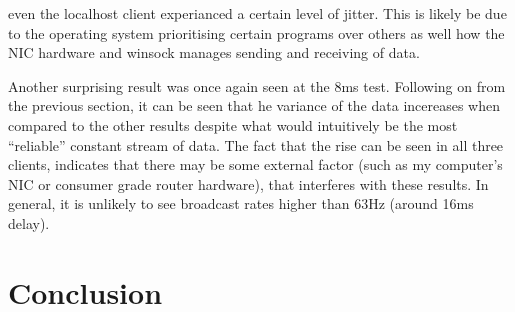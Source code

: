  even the localhost client experianced a certain level of jitter. This is likely be due to the operating system prioritising certain programs over others as well how the NIC hardware and winsock manages sending and receiving of data.

Another surprising result was once again seen at the 8ms test. Following on from the previous section, it can be seen that he variance of the data incereases when compared to the other results despite what would intuitively be the most ``reliable'' constant stream of data. The fact that the rise can be seen in all three clients, indicates that there may be some external factor (such as my computer's NIC or consumer grade router hardware), that interferes with these results. In general, it is unlikely to see broadcast rates higher than 63Hz (around 16ms delay).



\chapter{Conclusion}
